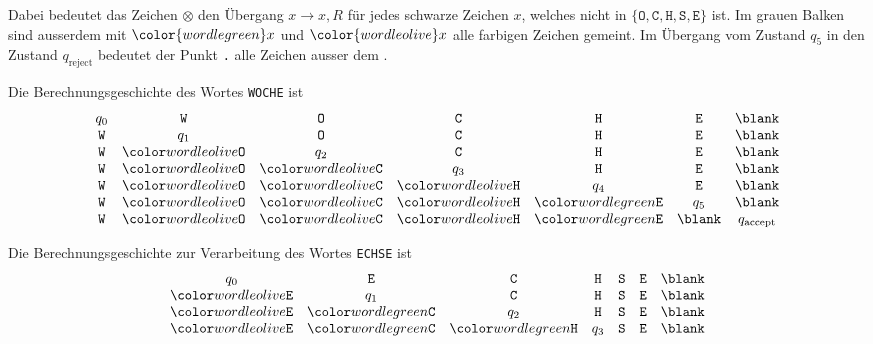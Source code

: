 \begin{loesung}
\begin{teilaufgaben}
\begin{center}
\end{center}
Dabei bedeutet das Zeichen $\otimes$ den Übergang $x\to x,R$ für jedes
schwarze Zeichen $x$, welches nicht in 
$\{
\texttt{O},
\texttt{C},
\texttt{H},
\texttt{S},
\texttt{E}
\}$ ist.
Im grauen Balken sind ausserdem mit ${\color{wordlegreen}x}$ und 
${\color{wordleolive}x}$ alle farbigen Zeichen gemeint.
Im Übergang vom Zustand $q_5$ in den Zustand $q_\text{reject}$
bedeutet der Punkt \texttt{.} alle Zeichen ausser dem \blank.
\item
Die Berechnungsgeschichte des Wortes \texttt{WOCHE} ist
\[
\begin{array}{ccccccc}
q_0        &\schwarz{W}&\schwarz{O}&\schwarz{C}&\schwarz{H}&\schwarz{E}&\blank\\
\schwarz{W}&q_1        &\schwarz{O}&\schwarz{C}&\schwarz{H}&\schwarz{E}&\blank\\
\schwarz{W}&\oliv{O}&q_2        &\schwarz{C}&\schwarz{H}&\schwarz{E}&\blank\\
\schwarz{W}&\oliv{O}&\oliv{C}&q_3        &\schwarz{H}&\schwarz{E}&\blank\\
\schwarz{W}&\oliv{O}&\oliv{C}&\oliv{H}&q_4        &\schwarz{E}&\blank\\
\schwarz{W}&\oliv{O}&\oliv{C}&\oliv{H}&\gruen{E}&q_5        &\blank\\
\schwarz{W}&\oliv{O}&\oliv{C}&\oliv{H}&\gruen{E}&\blank     &q_{\text{accept}}\\
\end{array}
\]
\item
Die Berechnungsgeschichte zur Verarbeitung des Wortes
\texttt{ECHSE} 
ist
\[
\begin{array}{ccccccc}
q_0        &\schwarz{E}&\schwarz{C}&\schwarz{H}&\schwarz{S}&\schwarz{E}&\blank\\
\oliv{E}&q_1        &\schwarz{C}&\schwarz{H}&\schwarz{S}&\schwarz{E}&\blank\\
\oliv{E}&\gruen{C}&q_2        &\schwarz{H}&\schwarz{S}&\schwarz{E}&\blank\\
\oliv{E}&\gruen{C}&\gruen{H}&q_3        &\schwarz{S}&\schwarz{E}&\blank\\

\end{array}\]
\end{teilaufgaben}
\end{loesung}

